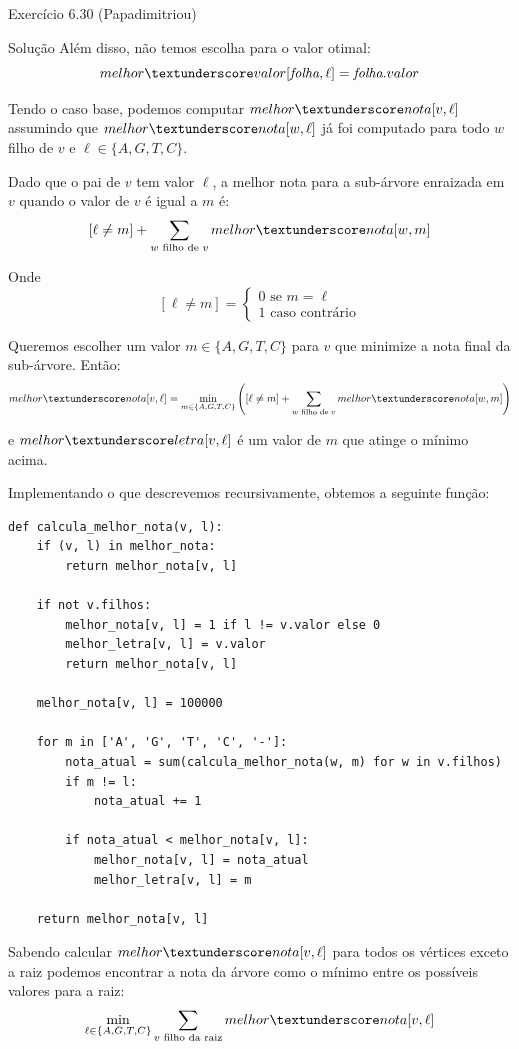 \documentclass[presentation]{beamer}
\newcommand{\tu}{\textunderscore}
\begin{document}
\begin{frame}[fragile,label=sec-4]{Exercício 6.30 (Papadimitriou)}
\begin{block}{Solução}
Além disso, não temos escolha para o valor otimal:
\[ melhor \tu valor[\textit{folha}, \ell] = \textit{folha}.valor \]

Tendo o caso base, podemos computar $melhor \tu nota[v, \ell]$
assumindo que $melhor \tu nota[w, \ell]$ já foi computado para todo
$w$ filho de $v$ e $\ell \in \{A, G, T, C\}$.

Dado que o pai de $v$ tem valor $\ell$, a melhor nota para a
sub-árvore enraizada em $v$ quando o valor de $v$ é igual a $m$ é:
\[ [\ell \neq m] + \sum_{w \text{ filho de }v} melhor \tu nota[w, m]\]

Onde \[[\ell \neq m] =  \begin{cases} 0 \text{ se } m = \ell \\
                                      1 \text{ caso contrário}\end{cases}\]

Queremos escolher um valor $m \in \{A, G, T, C\}$ para $v$
que minimize a nota final da sub-árvore. Então:
\[melhor \tu nota[v, \ell] = \min_{m \in \{A, G, T, C\}} \left([\ell
\neq m] + \sum_{w \text{ filho de }v} melhor \tu nota[w, m]\right)\]

e $melhor\tu letra[v, \ell]$ é um valor de $m$ que atinge o mínimo
acima.

Implementando o que descrevemos recursivamente, obtemos a seguinte
função:
\begin{verbatim}
def calcula_melhor_nota(v, l):
    if (v, l) in melhor_nota:
        return melhor_nota[v, l]

    if not v.filhos:
        melhor_nota[v, l] = 1 if l != v.valor else 0
        melhor_letra[v, l] = v.valor
        return melhor_nota[v, l]

    melhor_nota[v, l] = 100000

    for m in ['A', 'G', 'T', 'C', '-']:
        nota_atual = sum(calcula_melhor_nota(w, m) for w in v.filhos)
        if m != l:
            nota_atual += 1

        if nota_atual < melhor_nota[v, l]:
            melhor_nota[v, l] = nota_atual
            melhor_letra[v, l] = m

    return melhor_nota[v, l]
\end{verbatim}

Sabendo calcular $melhor \tu nota[v, \ell]$ para todos os vértices
exceto a raiz podemos encontrar a nota da árvore como o mínimo entre
os possíveis valores para a raiz:
\[ \min_{\ell \in \{A, G, T, C\}} \sum_{v \text{ filho da raiz}}
melhor \tu nota[v, \ell]\]


\end{block}
\end{frame}
\end{document}
